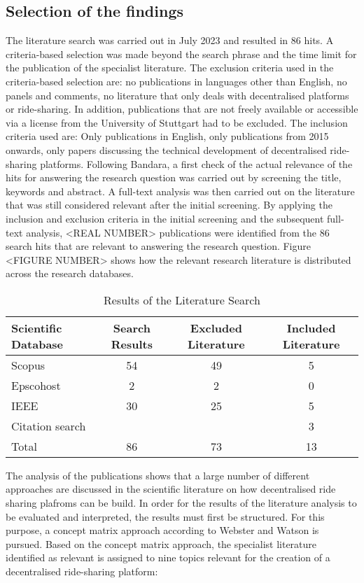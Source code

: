 \subsection{Selection of the findings}
The literature search was carried out in July 2023 and resulted in 86 hits. A criteria-based selection was made beyond the search phrase and the time limit for the publication of the specialist literature. The exclusion criteria used in the criteria-based selection are: no publications in languages other than English, no panels and comments, no literature that only deals with decentralised platforms or ride-sharing. In addition, publications that are not freely available or accessible via a license from the University of Stuttgart had to be excluded. The inclusion criteria used are: Only publications in English, only publications from 2015 onwards, only papers discussing the technical development of decentralised ride-sharing platforms.
Following Bandara, a first check of the actual relevance of the hits for answering the research question was carried out by screening the title, keywords and abstract. A full-text analysis was then carried out on the literature that was still considered relevant after the initial screening. By applying the inclusion and exclusion criteria in the initial screening and the subsequent full-text analysis, <REAL NUMBER> publications were identified from the 86 search hits that are relevant to answering the research question. Figure <FIGURE NUMBER> shows how the relevant research literature is distributed across the research databases.

\begin{table}[h]
\centering
\caption{Results of the Literature Search}
\begin{tabular}{|l|c|c|c|}
\hline
Scientific Database & Search Results & Excluded Literature & Included Literature \\ \hline
Scopus & 54 & 49 & 5 \\ \hline
Epscohost & 2 & 2 & 0 \\ \hline
IEEE & 30 & 25 & 5 \\ \hline
Citation search &  &  & 3 \\ \hline \hline
Total & 86 & 73 & 13 \\ \hline
\end{tabular}
\end{table}

The analysis of the publications shows that a large number of different approaches are discussed in the scientific literature on how decentralised ride sharing plafroms can be build. In order for the results of the literature analysis to be evaluated and interpreted, the results must first be structured. For this purpose, a concept matrix approach according to Webster and Watson is pursued. Based on the concept matrix approach, the specialist literature identified as relevant is assigned to nine topics relevant for the creation of a decentralised ride-sharing platform:

